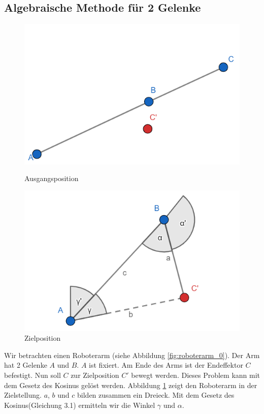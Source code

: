 \subsection{Algebraische Methode für 2 Gelenke}
\begin{figure}[!htb]
	\includegraphics[width=\linewidth]{img/roboterarm_0.png}
	\caption{Ausgangsposition}\label{fig:roboterarm_0}
	\endminipage\hfill
	\includegraphics[width=\linewidth]{img/roboterarm_1.png}
	\caption{Zielposition}\label{fig:roboterarm_1}
	\endminipage\hfill
\end{figure}
Wir betrachten einen Roboterarm (siehe Abbildung \ref{fig:roboterarm_0}). Der Arm hat 2 Gelenke $A$ und $B$. $A$ ist fixiert. Am Ende des Arms ist der Endeffektor $C$ befestigt. Nun soll $C$ zur Zielposition $C'$ bewegt werden. Dieses Problem kann mit dem Gesetz des Kosinus gelöst werden. Abbildung \ref{fig:roboterarm_1} zeigt den Roboterarm in der Zielstellung. $a$, $b$ und $c$ bilden zusammen ein Dreieck. Mit dem Gesetz des Kosinus(Gleichung 3.1) ermitteln wir die Winkel $\gamma$ und $\alpha$.\\
